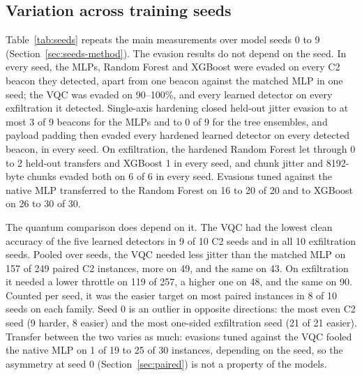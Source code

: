 \documentclass[preprint,12pt]{elsarticle}
\begin{document}
\subsection{Variation across training seeds}
\label{sec:seeds}
Table~\ref{tab:seeds} repeats the main measurements over model seeds 0 to 9
(Section~\ref{sec:seeds-method}). The evasion results do not depend on the seed. In every seed, the
MLPs, Random Forest and XGBoost were evaded on every C2 beacon they detected, apart from one beacon
against the matched MLP in one seed; the VQC was evaded on 90--100\%, and every learned detector on every
exfiltration it detected.
Single-axis hardening closed held-out jitter evasion to at most 3 of 9 beacons for the MLPs and to 0 of 9
for the tree ensembles, and payload padding then evaded every hardened learned detector on every
detected beacon, in every seed. On exfiltration, the hardened Random Forest let through 0 to 2 held-out
transfers and XGBoost 1 in every seed, and chunk jitter and 8192-byte chunks evaded both on 6 of 6 in
every seed. Evasions tuned against the native MLP transferred to the Random Forest on 16 to 20 of 20 and
to XGBoost on 26 to 30 of 30.

The quantum comparison does depend on it. The VQC had the lowest clean accuracy of the five learned
detectors in 9 of 10 C2 seeds and in all 10 exfiltration seeds. Pooled over seeds, the VQC needed less
jitter than the matched MLP on 157 of 249 paired C2 instances, more on 49, and the same on 43. On
exfiltration it needed a lower throttle on 119 of 257, a higher one on 48, and the same on 90. Counted
per seed, it was the easier target on most paired instances in 8 of 10 seeds on each family. Seed 0 is
an outlier in opposite directions: the most even C2 seed (9 harder, 8 easier) and the most one-sided
exfiltration seed (21 of 21 easier). Transfer between the two varies as much: evasions tuned against
the VQC fooled the native MLP on 1 of 19 to 25 of 30 instances, depending on the seed, so the asymmetry
at seed 0 (Section~\ref{sec:paired}) is not a property of the models.
\end{document}
